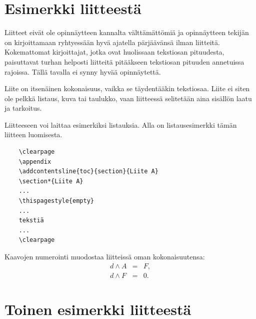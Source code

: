 \documentclass[finnish, 12pt, a4paper, sci, utf8, pdfa]{aaltothesis}
\begin{document}
\clearpage

\thesisappendix

\section{Esimerkki liitteestä\label{LiiteA}}

Liitteet eivät ole opinnäytteen kannalta välttämättömiä ja 
opinnäytteen tekijän on 
kirjoittamaan ryhtyessään hyvä ajatella pärjäävänsä ilman liitteitä.
Kokemattomat kirjoittajat, jotka ovat huolissaan
tekstiosan pituudesta, paisuttavat turhan 
helposti liitteitä pitääkseen tekstiosan pituuden annetuissa rajoissa.
Tällä tavalla ei synny hyvää opinnäytettä.   

Liite on itsenäinen kokonaisuus, vaikka se täydentääkin tekstiosaa.
Liite ei siten ole pelkkä listaus, kuva tai taulukko, vaan 
liitteessä selitetään aina sisällön laatu ja tarkoitus. 

Liitteeseen voi laittaa esimerkiksi listauksia. Alla on 
listausesimerkki tämän liitteen luomisesta. 

\begin{verbatim}
	\clearpage
	\appendix
	\addcontentsline{toc}{section}{Liite A}
	\section*{Liite A}
	...
	\thispagestyle{empty}
	...
	tekstiä
	...
	\clearpage
\end{verbatim}

Kaavojen numerointi muodostaa liitteissä oman kokonaisuutensa:
\begin{eqnarray}
d \wedge A  &=& F, \label{liitekaava1}\\
d \wedge F  &=& 0. \label{liitekaava2}
\end{eqnarray}


\clearpage
\section{Toinen esimerkki liitteestä\label{LiiteB}}

\end{document}
